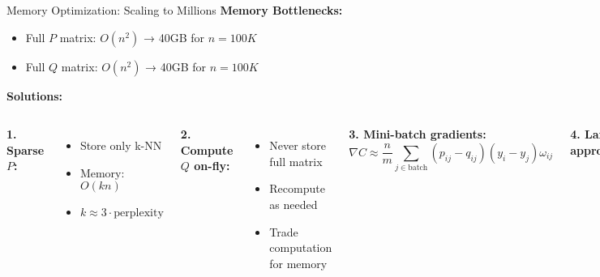 \begin{frame}{Memory Optimization: Scaling to Millions}
\textbf{Memory Bottlenecks:}
\begin{itemize}
\item Full $P$ matrix: $O(n^2)$ → 40GB for $n=100K$
  \item Full $Q$ matrix: $O(n^2)$ → 40GB for $n=100K$
    \end{itemize}
  
  \textbf{Solutions:}
  \begin{columns}
  \textbf{1. Sparse $P$:}
  \begin{itemize}
  \item Store only k-NN
  \item Memory: $O(kn)$
    \item $k \approx 3 \cdot \text{perplexity}$
    \end{itemize}
  
  \textbf{2. Compute $Q$ on-fly:}
  \begin{itemize}
  \item Never store full matrix
  \item Recompute as needed
  \item Trade computation for memory
  \end{itemize}
  
  \textbf{3. Mini-batch gradients:}
  $$\nabla C \approx \frac{n}{m}\sum_{j \in \text{batch}} (p_{ij} - q_{ij})(y_i - y_j)\omega_{ij}$$
    
    \textbf{4. Landmark approximation:}
  \begin{itemize}
  \item Select $L \ll n$ landmarks
  \item Approximate others
  \item Memory: $O(Ln)$
    \end{itemize}
  \end{columns}
  \end{frame}
  
